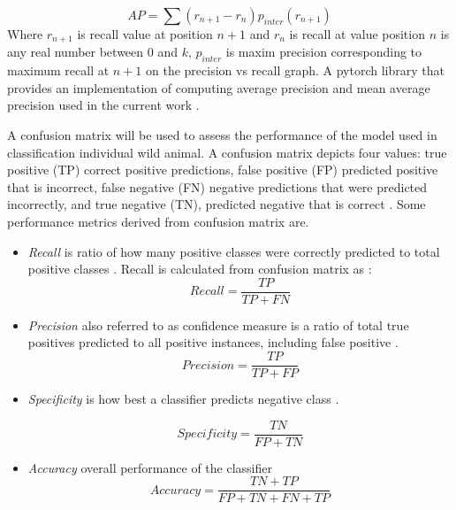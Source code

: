 \begin{equation}\label{ap:eq}
    AP = \sum(r_{n+1}-r_n)p_{inter}(r_{n+1})
\end{equation}
 Where $r_{n+1}$ is recall value at position $n+1$ and $r_n$ is recall at value position $n$ is any real number between 0 and $k$, $p_{inter}$ is maxim precision corresponding to maximum recall at $n+1$ on the  precision vs recall graph. A pytorch library that provides an implementation of computing average precision and mean average precision used in the current work \cite{Collobert2016TorchnetAO}. 


A confusion matrix will be used to assess the performance of the model used in classification individual wild animal. A confusion matrix depicts four values: true positive (TP) correct positive predictions, false positive (FP) predicted positive that is incorrect, false negative (FN) negative predictions that were predicted incorrectly, and true negative (TN), predicted negative that is correct \cite{sokolova2009systematic}. Some performance metrics derived from confusion matrix are. 
\begin{itemize}
    \item \textit{Recall} is  ratio of how many positive classes were correctly predicted to total positive classes \cite{sokolova2009systematic}. Recall is calculated from confusion matrix as : 
    \begin{equation} \label{recall:eq}
         Recall  = \frac{TP}{TP+FN}
    \end{equation}{}
   
    \item \textit{Precision} also referred to as confidence measure is a ratio of total true positives predicted to all positive instances, including false positive \cite{baeza1999modern}.    
     \begin{equation}\label{pres:eq}
         Precision  = \frac{TP}{TP+FP}
     \end{equation}{}
     
    \item \textit{Specificity} is how best a classifier predicts negative class \cite{sokolova2009systematic}. 
    
        \begin{equation}
         Specificity  = \frac{TN}{FP+TN}
        \end{equation}{}
    \item \textit{Accuracy} overall performance of the classifier 
    \begin{equation}
         Accuracy  = \frac{TN+TP}{FP+TN+FN+TP}
        \end{equation}{}
    
\end{itemize}{}

